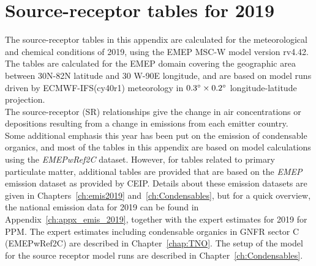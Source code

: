 \setcounter{page}{1}

\cleardoublepage
\chapter[SR tables for 2019]{Source-receptor tables for 2019}
\label{ch:appx_sr2019}



The source-receptor tables in this appendix are calculated for the
meteorological and chemical conditions of 2019, using the EMEP MSC-W model version rv4.42. The tables are calculated for the EMEP domain covering the geographic area between 30\degrees N-82\degrees N latitude and 30\degrees 
W-90\degrees E longitude, and
are based on model runs driven by ECMWF-IFS(cy40r1) meteorology in $0.3^{\circ} \times 0.2^{\circ}$ longitude-latitude projection.\\

The source-receptor (SR) relationships give
the change in air concentrations or depositions resulting from a
change in emissions from each emitter country.\\ 

Some additional emphasis this year has been put on the emission of condensable organics, and most of the tables in this appendix are based on model calculations using the \textit{EMEPwRef2C} dataset. However, for tables related to primary particulate matter, additional tables are provided that are based on the \textit{EMEP} emission dataset as provided by CEIP. Details about these emission datasets are given in Chapters~\ref{ch:emis2019} and~\ref{ch:Condensables}, but for a quick overview, the national emission data for 2019 can be found in Appendix~\ref{ch:appx_emis_2019}, together with the expert estimates for 2019 for PPM. The expert estimates including condensable organics in GNFR sector C (EMEPwRef2C) are described in Chapter~\ref{chap:TNO}. The setup of the model for the source receptor model runs are described in Chapter~\ref{ch:Condensables}.\\

